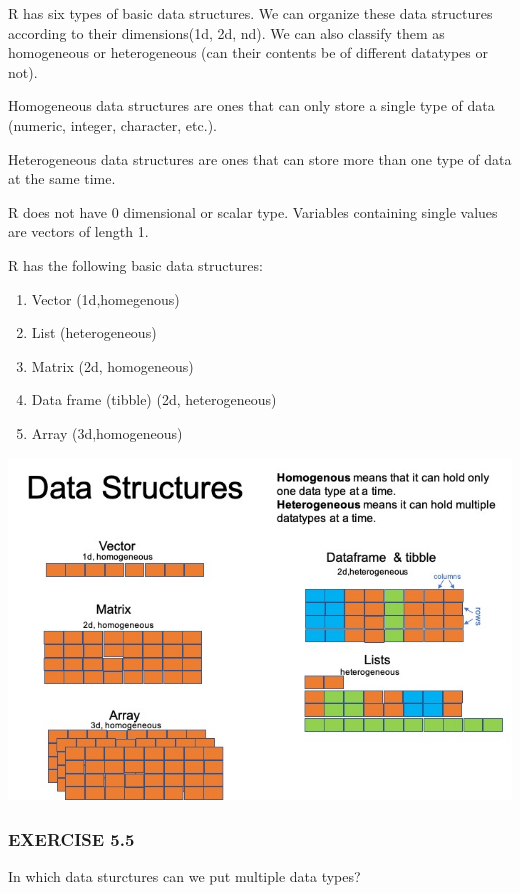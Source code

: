 \documentclass[
]{book}
\providecommand{\tightlist}{%
  \setlength{\itemsep}{0pt}\setlength{\parskip}{0pt}}
\begin{document}
R has six types of basic data structures. We can organize these data structures according to their dimensions(1d, 2d, nd). We can also classify them as homogeneous or heterogeneous (can their contents be of different datatypes or not).

Homogeneous data structures are ones that can only store a single type of data (numeric, integer, character, etc.).

Heterogeneous data structures are ones that can store more than one type of data at the same time.

R does not have 0 dimensional or scalar type. Variables containing single values are vectors of length 1.

R has the following basic data structures:

\begin{enumerate}
\def\labelenumi{\arabic{enumi}.}
\tightlist
\item
  Vector (1d,homegenous)
\item
  List (heterogeneous)
\item
  Matrix (2d, homogeneous)
\item
  Data frame (tibble) (2d, heterogeneous)
\item
  Array (3d,homogeneous)
\end{enumerate}

\includegraphics{data_s.jpg}

\subsubsection*{EXERCISE 5.5}\label{exercise-5.5}

In which data sturctures can we put multiple data types?
\end{document}
